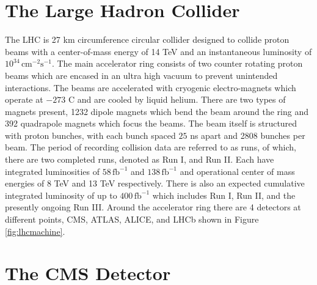 \section{The Large Hadron Collider}
The LHC is 27 km circumference circular collider designed to collide proton beams with a center-of-mass energy of 14 TeV and an instantaneous luminosity of $10^{34} \, \text{cm}^{-2}\text{s}^{-1}$\cite{Evans:2008zzb}. The main accelerator ring consists of two counter rotating proton beams which are encased in an ultra high vacuum to prevent unintended interactions. The beams are accelerated with cryogenic electro-magnets which operate at $-273$ \degree C and are cooled by liquid helium. There are two types of magnets present, 1232 dipole magnets which bend the beam around the ring and 392 quadrapole magnets which focus the beams.  The beam itself is structured with proton bunches, with each bunch spaced $25$ ns apart and 2808 bunches per beam. The period of recording collision data are referred to as runs, of which, there are two completed runs, denoted as Run I, and Run II. Each have integrated luminosities of $58 \, \text{fb}^{-1}$ and $138\, \text{fb}^{-1}$ and operational center of mass energies of 8 TeV and 13 TeV respectively. There is also an expected cumulative integrated luminosity of up to $400 \,\text{fb}^{-1}$ which includes Run I, Run II, and the presently ongoing Run III. Around the accelerator ring there are 4 detectors at different points, CMS, ATLAS, ALICE, and LHCb shown in Figure \ref{fig:lhcmachine}.




\section{The CMS Detector}

